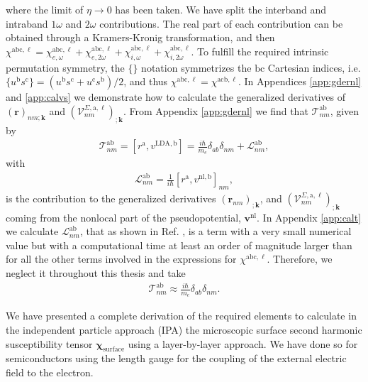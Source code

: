 \noindent where the limit of $\eta\to 0$ has been taken.
We have split the interband and intraband $1\omega$ and $2\omega$
contributions. The real part of each contribution can be obtained through
a Kramers-Kronig transformation,\cite{nicolas} and then
$\chi^{\mathrm{abc},\ell}
= \chi^{\mathrm{abc},\ell}_{e,\omega}
+ \chi^{\mathrm{abc},\ell}_{e,2\omega}
+ \chi^{\mathrm{abc},\ell}_{i,\omega}
+ \chi^{\mathrm{abc},\ell}_{i,2\omega}$.
To fulfill the required intrinsic permutation symmetry,\cite{rashkeevPRB98} the
$\{\}$ notation symmetrizes the $\mathrm{b}\mathrm{c}$ Cartesian indices, i.e. $
\{u^{\mathrm{b}}s^{\mathrm{c}}\}=(u^{\mathrm{b}}s^{\mathrm{c}}+u^{\mathrm{c}}s^{
\mathrm{b}})/2$, and thus
$\chi^{\mathrm{abc},\ell} = \chi^{\mathrm{acb},\ell}$.
In Appendices \ref{app:gdernl} and \ref{app:calvs} we demonstrate how to
calculate the generalized derivatives of $\left(\mathbf{r}\right)_{nm;\mathbf{k}}$ and
$\left(\mathcal{V}^{\Sigma,\mathrm{a},\ell}_{nm}\right)_{;\mathbf{k}}$. From Appendix \ref{app:gdernl} we find that $\mathcal{T}_{nm}^{\mathrm{a}\mathrm{b}}$, given by
\begin{align}\label{tau.1}
\mathcal{T}_{nm}^{\mathrm{a}\mathrm{b}}
=
[r^{\mathrm{a}},v^{\mathrm{LDA},\mathrm{b}}]= 
\frac{i\hbar}{m_{e}}\delta_{ab}\delta_{nm} +
\mathcal{L}_{nm}^{\mathrm{a}\mathrm{b}},
\end{align}  
with
\begin{align}\label{tau.2}
\mathcal{L}_{nm}^{\mathrm{a}\mathrm{b}}
= \frac{1}{i\hbar}[r^{\mathrm{a}},v^{\mathrm{nl},\mathrm{b}}]_{nm},
\end{align}
is the contribution to the generalized derivatives
$\left(\mathbf{r}_{nm}\right)_{;\mathbf{k}}$, and
$\left(\mathcal{V}^{\Sigma,\mathrm{a},\ell}_{nm}\right)_{;\mathbf{k}}$ coming
from the nonlocal part of the pseudopotential, $\mathbf{v}^{\mathrm{nl}}$. In
Appendix \ref{app:calt} we calculate $\mathcal{L}^{\mathrm{a}\mathrm{b}}_{nm}$,
that as shown in Ref. \cite{valerie}, is a term with a very small numerical
value but with a computational time at least an order of magnitude larger than
for all the other terms involved in the expressions for
$\chi^{\mathrm{abc},\ell}$. Therefore, we neglect it throughout this thesis and
take
\begin{align}\label{tau.69}
\mathcal{T}_{nm}^{\mathrm{a}\mathrm{b}}
\approx
\frac{i\hbar}{m_{e}}\delta_{ab}\delta_{nm}
.
\end{align} 

We have presented a complete derivation of the required elements to
calculate in the independent particle approach (IPA) the microscopic  
surface second harmonic susceptibility tensor $\boldsymbol{\chi}_{\mathrm{surface}}$ 
using a layer-by-layer approach. We have done so for semiconductors using 
the length gauge for the coupling of the external electric field to the 
electron. 

\stopcontents[chapters]

